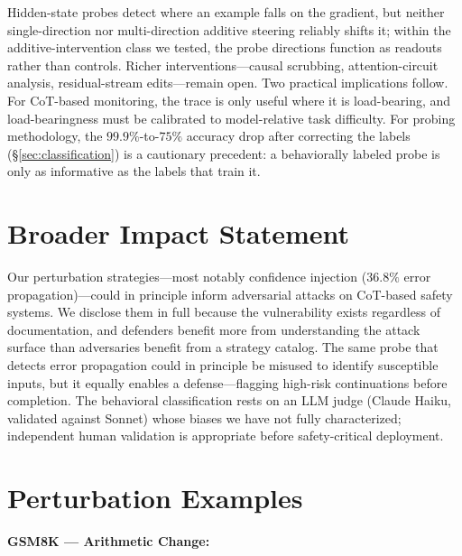 \documentclass[10pt]{article} %
\begin{document}
Hidden-state probes detect where an example falls on the gradient, but neither single-direction nor multi-direction additive steering reliably shifts it; within the additive-intervention class we tested, the probe directions function as readouts rather than controls. Richer interventions---causal scrubbing, attention-circuit analysis, residual-stream edits---remain open. Two practical implications follow. For CoT-based monitoring, the trace is only useful where it is load-bearing, and load-bearingness must be calibrated to model-relative task difficulty. For probing methodology, the $99.9\%$-to-$75\%$ accuracy drop after correcting the labels (\S\ref{sec:classification}) is a cautionary precedent: a behaviorally labeled probe is only as informative as the labels that train it.

\section*{Broader Impact Statement}

\noindent Our perturbation strategies---most notably confidence injection ($36.8\%$ error propagation)---could in principle inform adversarial attacks on CoT-based safety systems. We disclose them in full because the vulnerability exists regardless of documentation, and defenders benefit more from understanding the attack surface than adversaries benefit from a strategy catalog. The same probe that detects error propagation could in principle be misused to identify susceptible inputs, but it equally enables a defense---flagging high-risk continuations before completion. The behavioral classification rests on an LLM judge (Claude Haiku, validated against Sonnet) whose biases we have not fully characterized; independent human validation is appropriate before safety-critical deployment.





\appendix

\section{Perturbation Examples}
\label{app:perturbation}

\textbf{GSM8K --- Arithmetic Change:}
\end{document}
